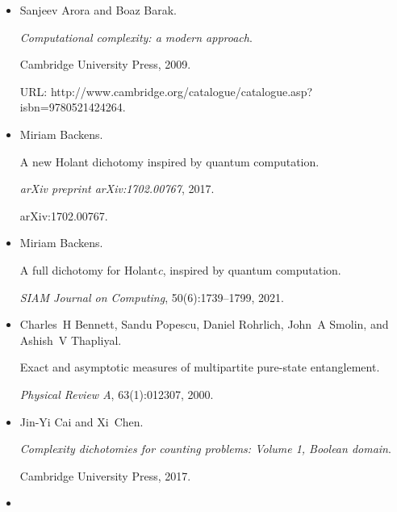 \begin{itemize}


\item[] 
[1]

Sanjeev Arora and Boaz Barak.


\emph{Computational complexity: a modern approach}.


Cambridge University Press, 2009.


URL:
http://www.cambridge.org/catalogue/catalogue.asp?isbn=9780521424264.





\item[] 
[2]

Miriam Backens.


A new Holant dichotomy inspired by quantum computation.


\emph{arXiv preprint arXiv:1702.00767}, 2017.


arXiv:1702.00767.





\item[] 
[3]

Miriam Backens.


A full dichotomy for Holant\emph{c}, inspired by quantum computation.


\emph{SIAM Journal on Computing}, 50(6):1739–1799, 2021.





\item[] 
[4]

Charles H Bennett, Sandu Popescu, Daniel Rohrlich, John A Smolin, and Ashish V
Thapliyal.


Exact and asymptotic measures of multipartite pure-state
entanglement.


\emph{Physical Review A}, 63(1):012307, 2000.





\item[] 
[5]

Jin-Yi Cai and Xi Chen.


\emph{Complexity dichotomies for counting problems: Volume 1,
Boolean domain}.


Cambridge University Press, 2017.





\item[] 
[6]


\end{itemize}
